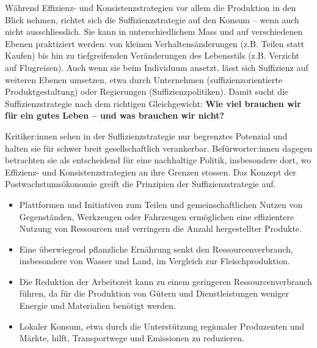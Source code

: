 \documentclass[
  letterpaper,
  DIV=11,
  numbers=noendperiod]{scrartcl}
\begin{document}
Während Effizienz- und Konsistenzstrategien vor allem die Produktion in
den Blick nehmen, richtet sich die Suffizienzstrategie auf den Konsum --
wenn auch nicht ausschliesslich. Sie kann in unterschiedlichem Mass und
auf verschiedenen Ebenen praktiziert werden: von kleinen
Verhaltensänderungen (z.B. Teilen statt Kaufen) bis hin zu
tiefgreifenden Veränderungen des Lebensstils (z.B. Verzicht auf
Flugreisen). Auch wenn sie beim Individuum ansetzt, lässt sich
Suffizienz auf weiteren Ebenen umsetzen, etwa durch Unternehmen
(suffizienzorientierte Produktgestaltung) oder Regierungen
(Suffizienzpolitiken). Damit sucht die Suffizienzstrategie nach dem
richtigen Gleichgewicht: \textbf{Wie viel brauchen wir für ein gutes
Leben -- und was brauchen wir nicht?}

Kritiker:innen sehen in der Suffizienzstrategie nur begrenztes Potenzial
und halten sie für schwer breit gesellschaftlich verankerbar.
Befürworter:innen dagegen betrachten sie als entscheidend für eine
nachhaltige Politik, insbesondere dort, wo Effizienz- und
Konsistenzstrategien an ihre Grenzen stossen. Das Konzept der
Postwachstumsökonomie greift die Prinzipien der Suffizienzstrategie auf.

\begin{tcolorbox}[enhanced jigsaw, opacitybacktitle=0.6, breakable, left=2mm, colback=white, leftrule=.75mm, colbacktitle=quarto-callout-tip-color!10!white, bottomrule=.15mm, toprule=.15mm, titlerule=0mm, title=\textcolor{quarto-callout-tip-color}{\faLightbulb}\hspace{0.5em}{Umsetzung der Suffizienzstrategie: Beispiele}, colframe=quarto-callout-tip-color-frame, bottomtitle=1mm, opacityback=0, arc=.35mm, toptitle=1mm, rightrule=.15mm, coltitle=black]

\begin{itemize}
\item
  Plattformen und Initiativen zum Teilen und gemeinschaftlichen Nutzen
  von Gegenständen, Werkzeugen oder Fahrzeugen ermöglichen eine
  effizientere Nutzung von Ressourcen und verringern die Anzahl
  hergestellter Produkte.
\item
  Eine überwiegend pflanzliche Ernährung senkt den Ressourcenverbrauch,
  insbesondere von Wasser und Land, im Vergleich zur Fleischproduktion.
\item
  Die Reduktion der Arbeitszeit kann zu einem geringeren
  Ressourcenverbrauch führen, da für die Produktion von Gütern und
  Dienstleistungen weniger Energie und Materialien benötigt werden.
\item
  Lokaler Konsum, etwa durch die Unterstützung regionaler Produzenten
  und Märkte, hilft, Transportwege und Emissionen zu reduzieren.
\end{itemize}

\end{tcolorbox}
\end{document}

